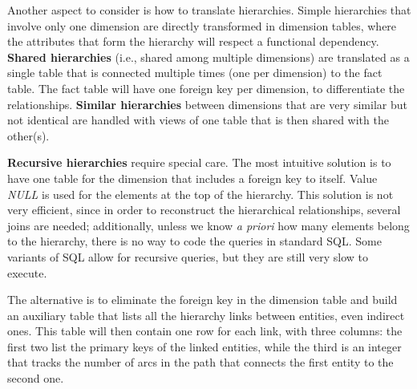 Another aspect to consider is how to translate hierarchies. Simple hierarchies that involve only one dimension are directly transformed in dimension tables, where the attributes that form the hierarchy will respect a functional dependency. \textbf{Shared hierarchies} (i.e., shared among multiple dimensions) are translated as a single table that is connected multiple times (one per dimension) to the fact table. The fact table will have one foreign key per dimension, to differentiate the relationships. \textbf{Similar hierarchies} between dimensions that are very similar but not identical are handled with views of one table that is then shared with the other(s).

\textbf{Recursive hierarchies} require special care. The most intuitive solution is to have one table for the dimension that includes a foreign key to itself. Value \textit{NULL} is used for the elements at the top of the hierarchy. This solution is not very efficient, since in order to reconstruct the hierarchical relationships, several joins are needed; additionally, unless we know \textit{a priori} how many elements belong to the hierarchy, there is no way to code the queries in standard SQL. Some variants of SQL allow for recursive queries, but they are still very slow to execute.

The alternative is to eliminate the foreign key in the dimension table and build an auxiliary table that lists all the hierarchy links between entities, even indirect ones. This table will then contain one row for each link, with three columns: the first two list the primary keys of the linked entities, while the third is an integer that tracks the number of arcs in the path that connects the first entity to the second one.

